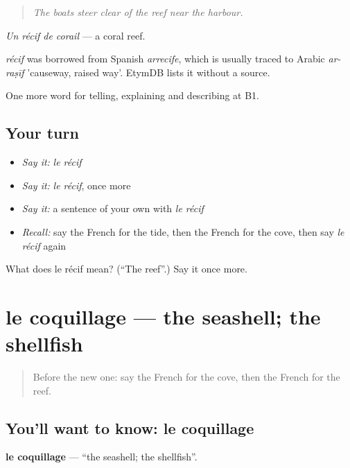 \begin{quote}
\emph{The boats steer clear of the reef near the harbour.}
\end{quote}

\emph{Un récif de corail} — a coral reef.

\begin{cousinweb}
\emph{récif} was borrowed from Spanish \emph{arrecife}, which is usually traced to Arabic \emph{ar-raṣīf} 'causeway, raised way'. EtymDB lists it without a source.
\end{cousinweb}

\begin{grammarlens}[title={What you've built}]
One more word for telling, explaining and describing at B1.
\end{grammarlens}

\subsection*{Your turn}
\begin{itemize}
\raggedright
  \item \emph{Say it:} \emph{le récif}
  \item \emph{Say it:} \emph{le récif}, once more
  \item \emph{Say it:} a sentence of your own with \emph{le récif}
  \item \emph{Recall:} say the French for the tide, then the French for the cove, then say \emph{le récif} again
\end{itemize}

\begin{tcolorbox}[breakable,colback=teal!4,colframe=teal!35!black,title={Before you move on}]
What does le récif mean? (\textquotedblleft{}The reef\textquotedblright{}.) Say it once more.
\end{tcolorbox}
\section[le coquillage]{le coquillage — the seashell; the shellfish}

\label{lesson:FR-C458-coquillage}



\begin{quote}
Before the new one: say the French for the cove, then the French for the reef.
\end{quote}

\subsection*{You'll want to know: le coquillage}
\textbf{le coquillage} — \textquotedblleft{}the seashell; the shellfish\textquotedblright{}.


